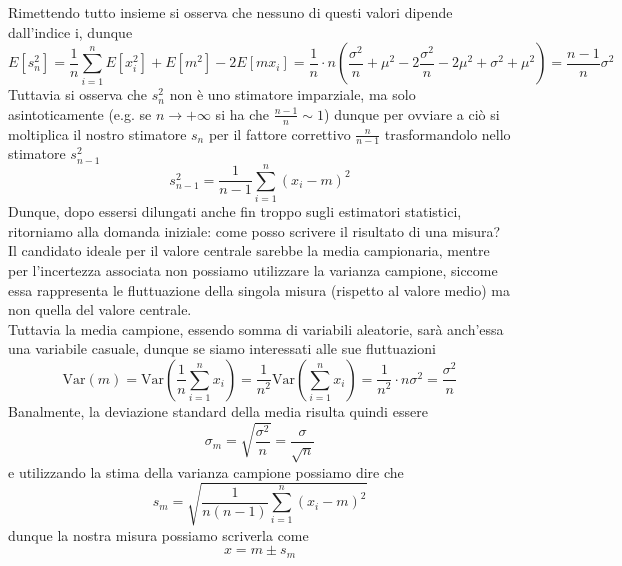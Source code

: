\documentclass{report}
\begin{document}
Rimettendo tutto insieme si osserva che nessuno di questi valori dipende dall'indice i, dunque
$$
E[s_n^2] = \frac{1}{n} \sum_{i=1}^n E[x_i^2] + E[m^2] - 2E[mx_i] = \frac{1}{n} \cdot n \left( \frac{\sigma^2}{n} + \mu^2 - 2\frac{\sigma^2}{n} - 2\mu^2 + \sigma^2 + \mu^2 \right) = \frac{n-1}{n}\sigma^2
$$
Tuttavia si osserva che $s_{n}^2$ non è uno stimatore imparziale, ma solo asintoticamente (e.g. se $n \to +\infty$ si ha che $\frac{n-1}{n} \sim 1$) dunque per ovviare a ciò si moltiplica il nostro stimatore $s_n$ per il fattore correttivo $\frac{n}{n-1}$ trasformandolo nello stimatore $s_{n-1}^2$
\begin{equation}
	s_{n-1}^2 = \frac{1}{n-1} \sum_{i=1}^n (x_i - m)^2
\end{equation}
\noindent Dunque, dopo essersi dilungati anche fin troppo sugli estimatori statistici, ritorniamo alla domanda iniziale: come posso scrivere il risultato di una misura? \\
Il candidato ideale per il valore centrale sarebbe la media campionaria, mentre per l'incertezza associata non possiamo utilizzare la varianza campione, siccome essa rappresenta le fluttuazione della singola misura (rispetto al valore medio) ma non quella del valore centrale.  \\
Tuttavia la media campione, essendo somma di variabili aleatorie, sarà anch'essa una variabile casuale, dunque se siamo interessati alle sue fluttuazioni
$$
	\text{Var}(m) = \text{Var} \left( \frac{1}{n} \sum_{i = 1}^n x_i \right) = \frac{1}{n^2} \text{Var} \left( \sum_{i=1}^n x_i \right) = \frac{1}{n^2} \cdot n\sigma^2 = \frac{\sigma^2}{n} 
$$
Banalmente, la deviazione standard della media risulta quindi essere
\begin{equation}
	\sigma_m = \sqrt{\frac{\sigma^2}{n}} = \frac{\sigma}{\sqrt{n}}
\end{equation}
e utilizzando la stima della varianza campione possiamo dire che
\begin{equation}
	s_m = \sqrt{\frac{1}{n(n-1)}\sum_{i=1}^n (x_i-m)^2}
\end{equation}
dunque la nostra misura possiamo scriverla come
$$
	x = m \pm s_m
$$
\end{document}
